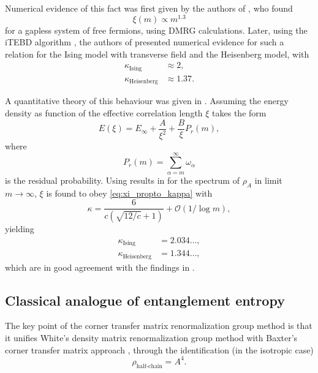 Numerical evidence of this fact was first given by the authors of \cite{andersson1999density}, who found
\begin{equation}
  \xi(m) \propto m^{1.3}
\end{equation}
for a gapless system of free fermions, using DMRG calculations. Later, using the iTEBD algorithm
\cite{vidal2007classical}, the authors of \cite{tagliacozzo2008scaling} presented numerical evidence for such a relation
for the Ising model with transverse field and the Heisenberg model, with
\begin{align}
  \kappa_{\text{Ising}} & \approx 2, \\
  \kappa_{\text{Heisenberg}} & \approx 1.37.
\end{align}

A quantitative theory of this behaviour was given in \cite{pollmann2009theory}.
Assuming the energy density as function of the effective correlation length $\xi$ takes the form
\begin{equation}
  E(\xi) = E_{\infty} + \frac{A}{\xi^2} + \frac{B}{\xi}P_r(m),
\end{equation}
where
\begin{equation}
  P_r(m) = \sum_{\alpha = m}^{\infty} \omega_{\alpha}
\end{equation}
is the residual probability.
Using results in \cite{calabrese2008entanglement} for the spectrum of $\rho_A$ in limit $m \to \infty$, $\xi$ is found
to obey \autoref{eq:xi_propto_kappa} with
\begin{equation}
  \kappa = \frac{6}{c(\sqrt{12/c} + 1)} + \mathcal{O}(1/\log m),
\end{equation}
yielding
\begin{align}
  \kappa_{\text{Ising}} & = 2.034\dots, \\
  \kappa_{\text{Heisenberg}} & = 1.344\dots,
\end{align}
which are in good agreement with the findings in \cite{tagliacozzo2008scaling}.


\subsection{Classical analogue of entanglement entropy}

The key point of the corner transfer matrix renormalization group method \cite{nishino1997corner, nishino1996corner} is
that it unifies White's density matrix renormalization group method \cite{white1992density} with Baxter's corner
transfer matrix approach \cite{baxter1968dimers, baxter1978variational}, through the identification (in the isotropic
case)
\begin{equation}\label{eq:correspondence_density_matrix_ctm}
  \rho_{\text{half-chain}} = A^4.
\end{equation}

